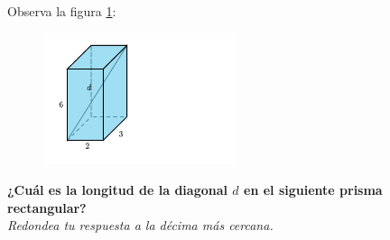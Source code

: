 Observa la figura \ref{fig:pitagoras3D_diag_01}:
\begin{figure}[H]
    \begin{center}
        \includegraphics[width=0.5\textwidth]{../images/pitagoras3D_diag_01.png}
    \end{center}
    \caption{}
    \label{fig:pitagoras3D_diag_01}
\end{figure}
\textbf{¿Cuál es la longitud de la diagonal $d$ en el siguiente prisma rectangular?}\\
\textit{Redondea tu respuesta a la décima más cercana.}